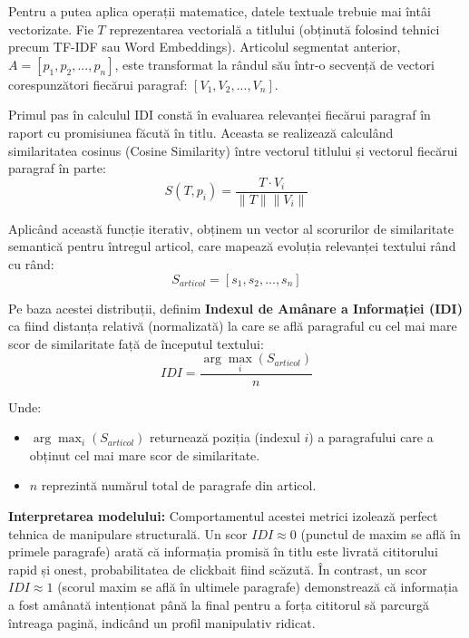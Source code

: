 \documentclass[12pt, a4paper]{article}
\begin{document}
Pentru a putea aplica operații matematice, datele textuale trebuie mai întâi vectorizate. Fie $T$ reprezentarea vectorială a titlului (obținută folosind tehnici precum TF-IDF sau Word Embeddings). Articolul segmentat anterior, $A = [p_1, p_2, ..., p_n]$, este transformat la rândul său într-o secvență de vectori corespunzători fiecărui paragraf: $[V_1, V_2, ..., V_n]$.

Primul pas în calculul IDI constă în evaluarea relevanței fiecărui paragraf în raport cu promisiunea făcută în titlu. Aceasta se realizează calculând similaritatea cosinus (Cosine Similarity) între vectorul titlului și vectorul fiecărui paragraf în parte:
\begin{equation}
S(T, p_i) = \frac{T \cdot V_i}{\|T\| \|V_i\|}
\end{equation}

Aplicând această funcție iterativ, obținem un vector al scorurilor de similaritate semantică pentru întregul articol, care mapează evoluția relevanței textului rând cu rând:
\begin{equation}
S_{articol} = [s_1, s_2, ..., s_n]
\end{equation}

Pe baza acestei distribuții, definim \textbf{Indexul de Amânare a Informației (IDI)} ca fiind distanța relativă (normalizată) la care se află paragraful cu cel mai mare scor de similaritate față de începutul textului:
\begin{equation}
IDI = \frac{\arg\max_{i} (S_{articol})}{n}
\end{equation}

Unde:
\begin{itemize}
    \item $\arg\max_{i} (S_{articol})$ returnează poziția (indexul $i$) a paragrafului care a obținut cel mai mare scor de similaritate.
    \item $n$ reprezintă numărul total de paragrafe din articol.
\end{itemize}

\textbf{Interpretarea modelului:} Comportamentul acestei metrici izolează perfect tehnica de manipulare structurală. Un scor $IDI \approx 0$ (punctul de maxim se află în primele paragrafe) arată că informația promisă în titlu este livrată cititorului rapid și onest, probabilitatea de clickbait fiind scăzută. În contrast, un scor $IDI \approx 1$ (scorul maxim se află în ultimele paragrafe) demonstrează că informația a fost amânată intenționat până la final pentru a forța cititorul să parcurgă întreaga pagină, indicând un profil manipulativ ridicat.
\end{document}

